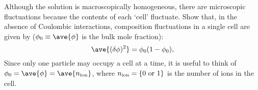 \smallskip \subp
Although the solution is macroscopically homogeneous,
there are microscopic fluctuations because
the contents of each `cell' fluctuate.
Show that, in the absence of Coulombic interactions,
composition fluctuations in a single cell are given by
($\phi_0 \equiv \ave{\phi}$ is the bulk mole fraction):
\begin{equation}
\ave{(\delta \phi)^2} = \phi_0 (1 - \phi_0) ,
\label{eq:random}
\end{equation}
Since only one particle may occupy a cell at a time,
it is useful to think of $\phi_0 = \ave{\phi} = \ave{n_{\rm ion}}$,
where $n_{\rm ion} = \{0\text{ or }1\}$ is the number of ions in the cell.


